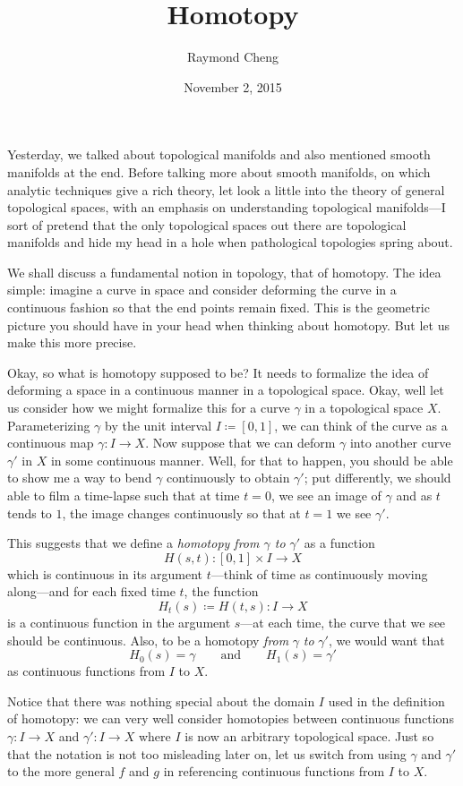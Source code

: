 \documentclass{axolotl}
\title{Homotopy}
\author{Raymond Cheng}
\date{November 2, 2015}
\begin{document}
\maketitle
Yesterday, we talked about topological manifolds and also mentioned smooth
manifolds at the end. Before talking more about smooth manifolds, on which
analytic techniques give a rich theory, let look a little into the theory of
general topological spaces, with an emphasis on understanding topological
manifolds---I sort of pretend that the only topological spaces out there are
topological manifolds and hide my head in a hole when pathological topologies
spring about.

We shall discuss a fundamental notion in topology, that of homotopy. The idea
simple: imagine a curve in space and consider deforming the curve in a
continuous fashion so that the end points remain fixed. This is the geometric
picture you should have in your head when thinking about homotopy. But let
us make this more precise.

Okay, so what is homotopy supposed to be? It needs to formalize the idea of
deforming a space in a continuous manner in a topological space. Okay, well let
us consider how we might formalize this for a curve \(\gamma\) in a topological
space \(X\). Parameterizing \(\gamma\) by the unit interval \(I \coloneqq [0,1]\), we can think of
the curve as a continuous map \(\gamma: I \to X\). Now suppose that we can
deform \(\gamma\) into another curve \(\gamma'\) in \(X\) in some continuous
manner. Well, for that to happen, you should be able to show me a way to bend
\(\gamma\) continuously to obtain \(\gamma'\); put differently, we should able
to film a time-lapse such that at time \(t = 0\), we see an image of \(\gamma\)
and as \(t\) tends to \(1\), the image changes continuously so that at \(t =
  1\) we see \(\gamma'\).

This suggests that we define a \emph{homotopy from \(\gamma\) to \(\gamma'\)}
as a function
\[ H(s,t): [0,1] \times I \to X \]
which is continuous in its argument \(t\)---think of time as continuously
moving along---and for each fixed time \(t\), the function
\[ H_t(s) \coloneqq H(t,s): I \to X \]
is a continuous function in the argument \(s\)---at each time, the curve that
we see should be continuous. Also, to be a homotopy \textit{from} \(\gamma\)
\textit{to} \(\gamma'\), we would want that
\[ H_0(s) = \gamma \qquad\text{and}\qquad H_1(s) = \gamma' \]
as continuous functions from \(I\) to \(X\).

Notice that there was nothing special about the domain \(I\) used in the
definition of homotopy: we can very well consider homotopies between continuous
functions \(\gamma: I \to X\) and \(\gamma': I \to X\) where \(I\) is now an
arbitrary topological space. Just so that the notation is not too misleading
later on, let us switch from using \(\gamma\) and \(\gamma'\) to the more general
\(f\) and \(g\) in referencing continuous functions from \(I\) to \(X\).
\end{document}
